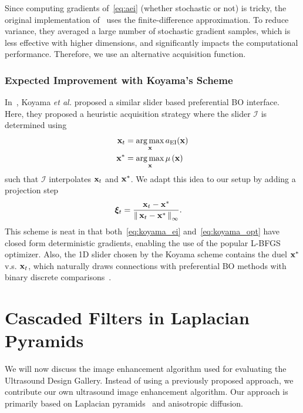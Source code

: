 Since computing gradients of~\cref{eq:aei} (whether stochastic or not) is tricky, the original implementation of~\cite{pmlr-v119-mikkola20a} uses the finite-difference approximation.
To reduce variance, they averaged a large number of stochastic gradient samples, which is less effective with higher dimensions, and significantly impacts the computational performance.
Therefore, we use an alternative acquisition function.

\subsubsection{Expected Improvement with Koyama's Scheme}
In~\cite{10.1145/3072959.3073598}, Koyama \textit{et al.} proposed a similar slider based preferential BO interface.
Here, they proposed a heuristic acquisition strategy where the slider \(\mathcal{I}\) is determined using
\begin{align}
  \mathbf{x}_t   &= \operatorname*{arg\,max}_{\mathbf{x}} a_{\mathrm{EI}}(\mathbf{x}) \label{eq:koyama_ei} \\
  \mathbf{x}^*   &= \operatorname*{arg\,max}_{\mathbf{x}} \mu\,(\mathbf{x}) \label{eq:koyama_opt}
\end{align}
such that \(\mathcal{I}\) interpolates \(\mathbf{x}_t\) and \(\mathbf{x}^*\).
We adapt this idea to our setup by adding a projection step
\begin{align}
  \bm{\xi}_t  &=  \frac{\mathbf{x}_t - \mathbf{x}^*}{\left\lVert\,  \mathbf{x}_t - \mathbf{x}^*  \,\right\rVert_{\infty}}.\label{eq:xi_proj}
\end{align}
This scheme is neat in that both~\cref{eq:koyama_ei} and~\cref{eq:koyama_opt} have closed form deterministic gradients, enabling the use of the popular L-BFGS~\cite{liu_limited_1989} optimizer.
Also, the 1D slider chosen by the Koyama scheme contains the duel \(\mathbf{x}^*\) v.s. \(\mathbf{x}_t\), which naturally draws connections with preferential BO methods with binary discrete comparisons~\cite{NIPS2007_b6a1085a}.

\section{Cascaded Filters in Laplacian Pyramids}\label{section:filter}

We will now discuss the image enhancement algorithm used for evaluating the Ultrasound Design Gallery.
Instead of using a previously proposed approach, we contribute our own ultrasound image enhancement algorithm.
Our approach is primarily based on Laplacian pyramids~\cite{zhang_multiscale_2006, zhang_nonlinear_2007, kang_new_2016} and anisotropic diffusion.

